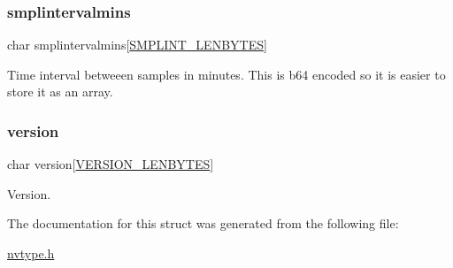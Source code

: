 \subsubsection{\texorpdfstring{smplintervalmins}{smplintervalmins}}
{\footnotesize\ttfamily char smplintervalmins\mbox{[}\mbox{\hyperlink{nvtype_8h_a44d3fb460b6c9383a2b3248544aa13d0}{S\+M\+P\+L\+I\+N\+T\+\_\+\+L\+E\+N\+B\+Y\+T\+ES}}\mbox{]}}

Time interval betweeen samples in minutes. This is b64 encoded so it is easier to store it as an array. \mbox{\label{structnvstruct_abfbbcb0a2e866121b24841f5494ac34b}} 
\subsubsection{\texorpdfstring{version}{version}}
{\footnotesize\ttfamily char version\mbox{[}\mbox{\hyperlink{nvtype_8h_ada79ed8a19f38854ae92032efcd9051b}{V\+E\+R\+S\+I\+O\+N\+\_\+\+L\+E\+N\+B\+Y\+T\+ES}}\mbox{]}}

Version. 

The documentation for this struct was generated from the following file\+:\begin{DoxyCompactItemize}
\item 
\mbox{\hyperlink{nvtype_8h}{nvtype.\+h}}\end{DoxyCompactItemize}
